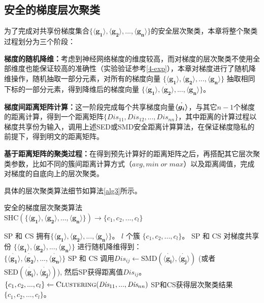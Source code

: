 \subsection{安全的梯度层次聚类}
为了完成对共享份梯度集合$\{\boldsymbol{\langle g_1\rangle}, \boldsymbol{\langle g_2\rangle},...,\boldsymbol{\langle g_n\rangle} \}$的安全层次聚类，本章将整个聚类过程划分为三个阶段：
\begin{compactenum}
	\item \textbf{梯度的随机降维：}考虑到神经网络梯度的维度较高，而对梯度的层次聚类不使用全部维度也能保证较高的准确性（实验验证参考\ref{4-exp}），本章对梯度进行了随机降维操作，随机抽取一部分元素，对所有的梯度向量 $\{\boldsymbol{\langle g_1\rangle}, \boldsymbol{\langle g_2\rangle},...,\boldsymbol{\langle g_n\rangle} \}$ 抽取相同下标的一部分元素，得到降维后的梯度向量 $\{\dot{\boldsymbol{\langle g_1\rangle}}, \dot{\boldsymbol{\langle g_2\rangle}},...,\dot{\boldsymbol{\langle g_n\rangle}} \}$。
	\item \textbf{梯度间距离矩阵计算：}这一阶段完成每个共享梯度向量$\dot{\boldsymbol{\langle g_i\rangle_{}}}$，与其它$n-1$个梯度的距离计算，得到一个距离矩阵$\{\textit{Dis}_{11}, \textit{Dis}_{12},...,\textit{Dis}_{nn}\}$，其中距离的计算过程以梯度共享份为输入，调用上述SED或SMD安全距离计算算法，在保证梯度隐私的前提下，得到明文的距离矩阵。
	\item \textbf{基于距离矩阵的聚类过程：}在得到预先计算好的距离矩阵之后，再搭配其它层次聚类参数，比如不同的簇间距离计算方式（$avg, min\; or\; max$）以及距离阈值，完成对梯度的自底向上的层次聚类。
\end{compactenum}
具体的层次聚类算法细节如算法\ref{alg3}所示。

\begin{algorithm}[htbp]
	\caption{安全的梯度层次聚类算法 \\ $\text{SHC}(\{\boldsymbol{\langle g_1\rangle}, \boldsymbol{\langle g_2\rangle},...,\boldsymbol{\langle g_n\rangle} \}) \rightarrow \{c_1,c_2,...,c_l \}$}
	\label{alg3}
	\begin{algorithmic}[1]
		\REQUIRE SP 和 CS 拥有$\{\boldsymbol{\langle g_1\rangle}, \boldsymbol{\langle g_2\rangle},...,\boldsymbol{\langle g_n\rangle} \}$。 
		\ENSURE $l$ 个簇 $\{c_1,c_2,...,c_l \}$。
		\STATE SP 和 CS 对梯度共享份 $\{\boldsymbol{\langle g_1\rangle}, \boldsymbol{\langle g_2\rangle},...,\boldsymbol{\langle g_n\rangle} \}$ 进行随机降维得到：\\ $\{\dot{\boldsymbol{\langle g_1\rangle}}, \dot{\boldsymbol{\langle g_2\rangle}},...,\dot{\boldsymbol{\langle g_n\rangle}} \}$
			\STATE SP 和 CS 调用$\textit{Dis}_{ij} \xleftarrow{}\text{SMD}(\dot{\boldsymbol{\langle g_i\rangle}}, \dot{\boldsymbol{\langle g_j\rangle}})$ (或者 $\text{SED}(\dot{\boldsymbol{\langle g_i\rangle}}, \dot{\boldsymbol{\langle g_j\rangle}})$), 然后SP获得距离值$\textit{Dis}_{ij}$。
		\ENDFOR
		\ENDFOR
		\STATE $\{c_1,c_2,...,c_l \} \xleftarrow{} \textsc{Clustering}(\textit{Dis}_{11},...,\textit{Dis}_{nn})$ 
		\RETURN SP和CS获得层次聚类结果 $\{c_1,c_2,...,c_l \}$。
	\end{algorithmic}
\end{algorithm}


